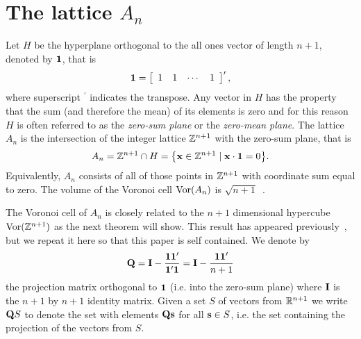 \documentclass[draftcls, onecolumn, 11pt]{IEEEtran}
\begin{document}
\section{The lattice $A_n$}\label{sec:lattice-a_n}
Let $H$ be the hyperplane orthogonal to the all ones vector of length $n+1$, denoted by $\boldsymbol{1}$, that is
\[
\boldsymbol{1} = \left[ \begin{array}{cccc} 1 & 1 & \cdots & 1 \end{array} \right]^\prime,
\]
where superscript $^\prime$ indicates the transpose.  Any vector in $H$ has the property that the sum (and therefore the mean) of its elements is zero and for this reason $H$ is often referred to as the \emph{zero-sum plane} or the \emph{zero-mean plane}.
The lattice $A_n$ is the intersection of the integer lattice ${\mathbb Z}^{n+1}$ with the zero-sum plane, that is
\begin{equation}
\label{eq:An_sub_Zn}
  A_{n} = \ints^{n+1} \cap H = \big\{ \xbf \in \ints^{n+1} \mid \xbf\cdot\onebf = 0  \big\}.
\end{equation}
Equivalently, $A_n$ consists of all of those points in ${\mathbb Z}^{n+1}$ with coordinate sum equal to zero.
The volume of the Voronoi cell $\operatorname{Vor}(A_n)$ is $\sqrt{n+1}$~\cite[p. 108]{SPLAG}.

The Voronoi cell of $A_n$ is closely related to the $n+1$ dimensional hypercube $\operatorname{Vor}({\mathbb Z}^{n+1})$ as the next theorem will show.  This result has appeared previously~\cite{McKilliam2009CoxeterLattices,McKilliam2010thesis}, but we repeat it here so that this paper is self contained.  We denote by
\[
\mathbf{Q} = \mathbf{I} - \frac{\boldsymbol{1}\boldsymbol{1}^\prime}{\boldsymbol{1}^\prime \boldsymbol{1}} = \mathbf{I} - \frac{\boldsymbol{1}\boldsymbol{1}^\prime}{n+1}
\]
the projection matrix orthogonal to $\boldsymbol{1}$ (i.e. into the zero-sum plane) where $\mathbf{I}$ is the $n+1$ by $n+1$ identity matrix.  Given a set $S$ of vectors from ${\mathbb R}^{n+1}$ we write $\mathbf{Q} S$  to denote the set with elements $\mathbf{Q} \mathbf{s}$ for all $\mathbf{s} \in S$, i.e. the set containing the projection of the vectors from $S$.
\end{document}

